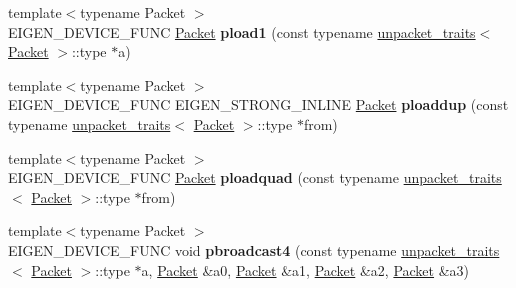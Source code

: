 \begin{DoxyCompactItemize}
\item 
\mbox{\label{namespace_eigen_1_1internal_adb6cba700a88a195f7bcb75db14bce7f}} 
{\footnotesize template$<$typename Packet $>$ }\\E\+I\+G\+E\+N\+\_\+\+D\+E\+V\+I\+C\+E\+\_\+\+F\+U\+NC \hyperlink{union_eigen_1_1internal_1_1_packet}{Packet} {\bfseries pload1} (const typename \hyperlink{struct_eigen_1_1internal_1_1unpacket__traits}{unpacket\+\_\+traits}$<$ \hyperlink{union_eigen_1_1internal_1_1_packet}{Packet} $>$\+::type $\ast$a)
\item 
\mbox{\label{namespace_eigen_1_1internal_aa32bad7af5be0497a9f91179d1572479}} 
{\footnotesize template$<$typename Packet $>$ }\\E\+I\+G\+E\+N\+\_\+\+D\+E\+V\+I\+C\+E\+\_\+\+F\+U\+NC E\+I\+G\+E\+N\+\_\+\+S\+T\+R\+O\+N\+G\+\_\+\+I\+N\+L\+I\+NE \hyperlink{union_eigen_1_1internal_1_1_packet}{Packet} {\bfseries ploaddup} (const typename \hyperlink{struct_eigen_1_1internal_1_1unpacket__traits}{unpacket\+\_\+traits}$<$ \hyperlink{union_eigen_1_1internal_1_1_packet}{Packet} $>$\+::type $\ast$from)
\item 
\mbox{\label{namespace_eigen_1_1internal_aee419455c26d707fd42fe49c7212b9ce}} 
{\footnotesize template$<$typename Packet $>$ }\\E\+I\+G\+E\+N\+\_\+\+D\+E\+V\+I\+C\+E\+\_\+\+F\+U\+NC \hyperlink{union_eigen_1_1internal_1_1_packet}{Packet} {\bfseries ploadquad} (const typename \hyperlink{struct_eigen_1_1internal_1_1unpacket__traits}{unpacket\+\_\+traits}$<$ \hyperlink{union_eigen_1_1internal_1_1_packet}{Packet} $>$\+::type $\ast$from)
\item 
\mbox{\label{namespace_eigen_1_1internal_a351c452188046982bb21dc294d11691b}} 
{\footnotesize template$<$typename Packet $>$ }\\E\+I\+G\+E\+N\+\_\+\+D\+E\+V\+I\+C\+E\+\_\+\+F\+U\+NC void {\bfseries pbroadcast4} (const typename \hyperlink{struct_eigen_1_1internal_1_1unpacket__traits}{unpacket\+\_\+traits}$<$ \hyperlink{union_eigen_1_1internal_1_1_packet}{Packet} $>$\+::type $\ast$a, \hyperlink{union_eigen_1_1internal_1_1_packet}{Packet} \&a0, \hyperlink{union_eigen_1_1internal_1_1_packet}{Packet} \&a1, \hyperlink{union_eigen_1_1internal_1_1_packet}{Packet} \&a2, \hyperlink{union_eigen_1_1internal_1_1_packet}{Packet} \&a3)

\end{DoxyCompactItemize}
